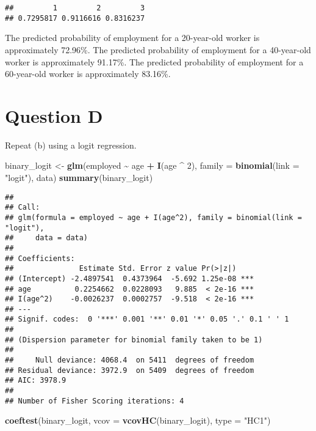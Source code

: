 \documentclass[
]{article}
\newenvironment{Shaded}{\begin{snugshade}}{\end{snugshade}}
\newcommand{\AttributeTok}[1]{\textcolor[rgb]{0.13,0.29,0.53}{#1}}
\newcommand{\DecValTok}[1]{\textcolor[rgb]{0.00,0.00,0.81}{#1}}
\newcommand{\FunctionTok}[1]{\textcolor[rgb]{0.13,0.29,0.53}{\textbf{#1}}}
\newcommand{\NormalTok}[1]{#1}
\newcommand{\OtherTok}[1]{\textcolor[rgb]{0.56,0.35,0.01}{#1}}
\newcommand{\SpecialCharTok}[1]{\textcolor[rgb]{0.81,0.36,0.00}{\textbf{#1}}}
\newcommand{\StringTok}[1]{\textcolor[rgb]{0.31,0.60,0.02}{#1}}
\begin{document}
\begin{verbatim}
##         1         2         3 
## 0.7295817 0.9116616 0.8316237
\end{verbatim}

The predicted probability of employment for a 20-year-old worker is
approximately 72.96\%. The predicted probability of employment for a
40-year-old worker is approximately 91.17\%. The predicted probability
of employment for a 60-year-old worker is approximately 83.16\%.

\hypertarget{question-d}{%
\section{Question D}\label{question-d}}

Repeat (b) using a logit regression.

\begin{Shaded}
\begin{Highlighting}[]
\NormalTok{binary\_logit }\OtherTok{\textless{}{-}} \FunctionTok{glm}\NormalTok{(employed }\SpecialCharTok{\textasciitilde{}}\NormalTok{ age }\SpecialCharTok{+} \FunctionTok{I}\NormalTok{(age }\SpecialCharTok{\^{}} \DecValTok{2}\NormalTok{), }
                    \AttributeTok{family =} \FunctionTok{binomial}\NormalTok{(}\AttributeTok{link =} \StringTok{"logit"}\NormalTok{), }
\NormalTok{                    data)}
\FunctionTok{summary}\NormalTok{(binary\_logit)}
\end{Highlighting}
\end{Shaded}

\begin{verbatim}
## 
## Call:
## glm(formula = employed ~ age + I(age^2), family = binomial(link = "logit"), 
##     data = data)
## 
## Coefficients:
##               Estimate Std. Error z value Pr(>|z|)    
## (Intercept) -2.4897541  0.4373964  -5.692 1.25e-08 ***
## age          0.2254662  0.0228093   9.885  < 2e-16 ***
## I(age^2)    -0.0026237  0.0002757  -9.518  < 2e-16 ***
## ---
## Signif. codes:  0 '***' 0.001 '**' 0.01 '*' 0.05 '.' 0.1 ' ' 1
## 
## (Dispersion parameter for binomial family taken to be 1)
## 
##     Null deviance: 4068.4  on 5411  degrees of freedom
## Residual deviance: 3972.9  on 5409  degrees of freedom
## AIC: 3978.9
## 
## Number of Fisher Scoring iterations: 4
\end{verbatim}

\begin{Shaded}
\begin{Highlighting}[]
\FunctionTok{coeftest}\NormalTok{(binary\_logit, }\AttributeTok{vcov =} \FunctionTok{vcovHC}\NormalTok{(binary\_logit), }\AttributeTok{type =} \StringTok{"HC1"}\NormalTok{)                     }
\end{Highlighting}
\end{Shaded}
\end{document}
